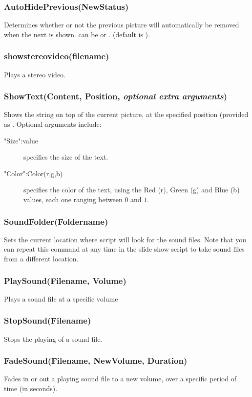 \subsubsection{AutoHidePrevious(NewStatus)}
Determines whether or not the previous picture will automatically be removed when the next is shown.  can be  or . (default is ).

\subsubsection{showstereovideo(filename)}
Plays a stereo video.


\subsubsection{ShowText(Content, Position, \textit{optional extra arguments})}
Shows the string  on top of the current picture, at the specified position (provided as . Optional arguments include:
\begin{description}
\item["Size":value] specifies the size of the text.
\item["Color":Color(r,g,b)] specifies the color of the text, using the Red (r), Green (g) and Blue (b) values, each one ranging between $0$ and $1$.
\end{description}

\subsubsection{SoundFolder(Foldername)}
Sets the current location where script will look for the sound files. Note that you can repeat this command at any time in the slide show script to take sound files from a different location.

\subsubsection{PlaySound(Filename, Volume)}
Plays a sound file at a specific volume

\subsubsection{StopSound(Filename)}
Stops the playing of a sound file.

\subsubsection{FadeSound(Filename, NewVolume, Duration)}
Fades in or out a playing sound file to a new volume, over a specific period of time (in seconds).

